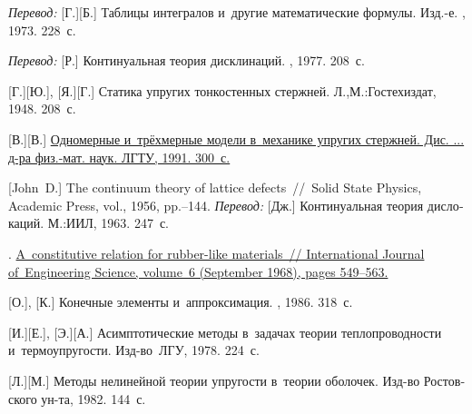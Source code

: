 \begin{thebibliography}{123}
\begin{otherlanguage}{russian}
\emph{Перевод:} [Г.][Б.] Таблицы интегралов и~другие математические формулы. Изд.\hbox{-}е. \naukapublisher, 1973. 228~с.


\emph{Перевод:} [Р.] Континуальная теория дисклинаций. \mirpublisher, 1977. 208~с.

[Г.][Ю.], [Я.][Г.] Статика упругих тонкостенных стержней. Л.,\:М.:\;Гостехиздат, 1948. 208~с.

[В.][В.] \href{https://www.researchgate.net/publication/320895320_Odnomernye_i_trehmernye_modeli_v_mehanike_uprugih_sterznej}{Одномерные и~трёхмерные модели в~механике упругих стержней. Дис. ... д\hbox{-}ра физ.\hbox{-}мат. наук. ЛГТУ, 1991. 300~с.}

[John~D.] The continuum theory of lattice defects~//~Solid State Physics, Academic Press, vol., 1956, pp.\hbox{--}144.
\emph{Перевод:} [Дж.] Континуальная теория дислокаций. М.:\;ИИЛ, 1963. 247~с.

. \href{https://kundoc.com/pdf-a-constitutive-relation-for-rubber-like-materials-.html}{A~constitutive relation for rubber-like materials~// International Journal of~Engineering Science, volume~6 (September 1968), pages 549\hbox{--}563.}

[О.], [К.] Конечные элементы и~аппроксимация. \mirpublisher, 1986. 318~с.

[И.][Е.], [Э.][А.] Асимптотические методы в~задачах теории теплопроводности и~термоупругости. Изд\hbox{-}во~ЛГУ, 1978. 224~с.

[Л.][М.] Методы нелинейной теории упругости в~теории оболочек.
Изд\hbox{-}во Ростовского ун\hbox{-}та,
1982. 144~с.


\end{otherlanguage}
\end{thebibliography}
